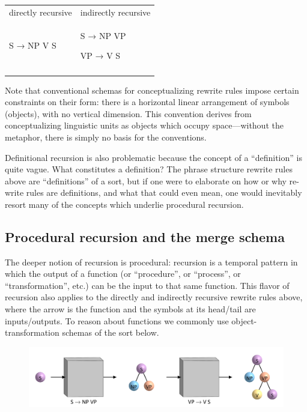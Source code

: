 \begin{tabularx}{\textwidth}{XX}
\lsptoprule
directly recursive & indirectly recursive\\
S → NP V S & S → NP VP

VP →  V S\\
\lspbottomrule
\end{tabularx}
  Note that conventional schemas for conceptualizing rewrite rules impose certain constraints on their form: there is a horizontal linear arrangement of symbols (objects), with no vertical dimension. This convention derives from conceptualizing linguistic units as objects which occupy space—without the metaphor, there is simply no basis for the conventions.

  Definitional recursion is also problematic because the concept of a “definition” is quite vague. What constitutes a definition? The phrase structure rewrite rules above are “definitions” of a sort, but if one were to elaborate on how or why re-write rules are definitions, and what that could even mean, one would inevitably resort many of the concepts which underlie procedural recursion.

\subsection{Procedural recursion and the merge schema}

The deeper notion of recursion is procedural: recursion is a temporal pattern in which the output of a function (or “procedure”, or “process”, or “transformation”, etc.) can be the input to that same function. This flavor of recursion also applies to the directly and indirectly recursive rewrite rules above, where the arrow is the function and the symbols at its head/tail are inputs/outputs. To reason about functions we commonly use object-transformation schemas of the sort below.

  
\begin{figure}
\includegraphics[width=\textwidth]{figures/Tilsen-img107.png}
\caption{\missingcaption}
\label{fig:}
\end{figure}
 

